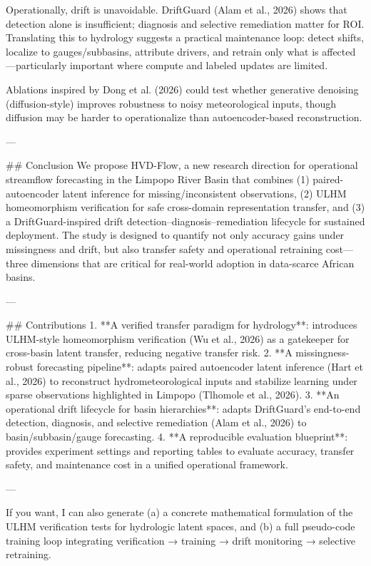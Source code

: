 Operationally, drift is unavoidable. DriftGuard (Alam et al., 2026) shows that detection alone is insufficient; diagnosis and selective remediation matter for ROI. Translating this to hydrology suggests a practical maintenance loop: detect shifts, localize to gauges/subbasins, attribute drivers, and retrain only what is affected—particularly important where compute and labeled updates are limited.

Ablations inspired by Dong et al. (2026) could test whether generative denoising (diffusion-style) improves robustness to noisy meteorological inputs, though diffusion may be harder to operationalize than autoencoder-based reconstruction.

---

## Conclusion  
We propose HVD-Flow, a new research direction for operational streamflow forecasting in the Limpopo River Basin that combines (1) paired-autoencoder latent inference for missing/inconsistent observations, (2) ULHM homeomorphism verification for safe cross-domain representation transfer, and (3) a DriftGuard-inspired drift detection–diagnosis–remediation lifecycle for sustained deployment. The study is designed to quantify not only accuracy gains under missingness and drift, but also transfer safety and operational retraining cost—three dimensions that are critical for real-world adoption in data-scarce African basins.

---

## Contributions  
1. **A verified transfer paradigm for hydrology**: introduces ULHM-style homeomorphism verification (Wu et al., 2026) as a gatekeeper for cross-basin latent transfer, reducing negative transfer risk.  
2. **A missingness-robust forecasting pipeline**: adapts paired autoencoder latent inference (Hart et al., 2026) to reconstruct hydrometeorological inputs and stabilize learning under sparse observations highlighted in Limpopo (Tlhomole et al., 2026).  
3. **An operational drift lifecycle for basin hierarchies**: adapts DriftGuard’s end-to-end detection, diagnosis, and selective remediation (Alam et al., 2026) to basin/subbasin/gauge forecasting.  
4. **A reproducible evaluation blueprint**: provides experiment settings and reporting tables to evaluate accuracy, transfer safety, and maintenance cost in a unified operational framework.

---  

If you want, I can also generate (a) a concrete mathematical formulation of the ULHM verification tests for hydrologic latent spaces, and (b) a full pseudo-code training loop integrating verification → training → drift monitoring → selective retraining.